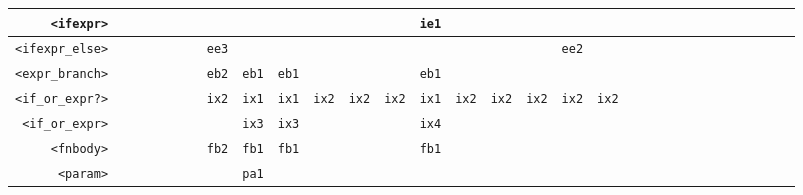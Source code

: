 \documentclass[11pt,a4paper]{article}
\newcommand*\id[1]{\texttt{#1}}
\begin{document}
\begin{table}[H]
\begin{adjustbox}{width=\textwidth}
\begin{tabular}{|r||c|c|c|c|c|c|c|c|c|c|c|c|c|c|c|c|c|c|c|c|c|c|c|c|}
        \id{<ifexpr>}        & \id{   }                 & \id{   }    & \id{   }  & \id{   }  & \id{   }   & \id{   }   & \id{   }    & \id{   }  & \id{   }  & \id{   }     & \id{ie1} & \id{   }    & \id{   }  & \id{   }     & \id{   }   & \id{   } & \id{   } & \id{   }    & \id{   } & \id{   } & \id{   } & \id{   } & \id{   } & \id{   } \\ \hline
        \id{<ifexpr\_else>}  & \id{   }                 & \id{   }    & \id{   }  & \id{   }  & \id{ee3}   & \id{   }   & \id{   }    & \id{   }  & \id{   }  & \id{   }     & \id{   } & \id{   }    & \id{   }  & \id{   }     & \id{ee2}   & \id{   } & \id{   } & \id{   }    & \id{   } & \id{   } & \id{   } & \id{   } & \id{   } & \id{   } \\ \hline
        \id{<expr\_branch>}  & \id{   }                 & \id{   }    & \id{   }  & \id{   }  & \id{eb2}   & \id{eb1}   & \id{eb1}    & \id{   }  & \id{   }  & \id{   }     & \id{eb1} & \id{   }    & \id{   }  & \id{   }     & \id{   }   & \id{   } & \id{   } & \id{   }    & \id{   } & \id{   } & \id{   } & \id{   } & \id{   } & \id{   } \\ \hline
        \id{<if\_or\_expr?>} & \id{   }                 & \id{   }    & \id{   }  & \id{   }  & \id{ix2}   & \id{ix1}   & \id{ix1}    & \id{ix2}  & \id{ix2}  & \id{ix2}     & \id{ix1} & \id{ix2}    & \id{ix2}  & \id{ix2}     & \id{ix2}   & \id{ix2} & \id{   } & \id{   }    & \id{   } & \id{   } & \id{   } & \id{   } & \id{   } & \id{   } \\ \hline
        \id{<if\_or\_expr>}  & \id{   }                 & \id{   }    & \id{   }  & \id{   }  & \id{   }   & \id{ix3}   & \id{ix3}    & \id{   }  & \id{   }  & \id{   }     & \id{ix4} & \id{   }    & \id{   }  & \id{   }     & \id{   }   & \id{   } & \id{   } & \id{   }    & \id{   } & \id{   } & \id{   } & \id{   } & \id{   } & \id{   } \\ \hline
        \id{<fnbody>}        & \id{   }                 & \id{   }    & \id{   }  & \id{   }  & \id{fb2}   & \id{fb1}   & \id{fb1}    & \id{   }  & \id{   }  & \id{   }     & \id{fb1} & \id{   }    & \id{   }  & \id{   }     & \id{   }   & \id{   } & \id{   } & \id{   }    & \id{   } & \id{   } & \id{   } & \id{   } & \id{   } & \id{   } \\ \hline
        \id{<param>}         & \id{   }                 & \id{   }    & \id{   }  & \id{   }  & \id{   }   & \id{pa1}   & \id{   }    & \id{   }  & \id{   }  & \id{   }     & \id{   } & \id{   }    & \id{   }  & \id{   }     & \id{   }   & \id{   } & \id{   } & \id{   }    & \id{   } & \id{   } & \id{   } & \id{   } & \id{   } & \id{   } \\ \hline

\end{tabular}
\end{adjustbox}
\end{table}
\end{document}
